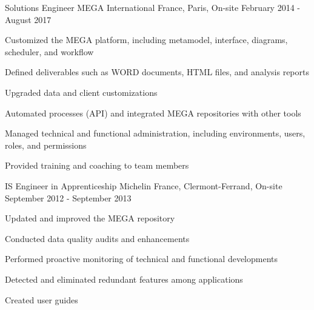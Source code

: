 \begin{cventries}
  \cventry
    {Solutions Engineer}
    {MEGA International}
    {France, Paris, On-site}
    {February 2014 - August 2017}
    {
      \begin{cvitems}
        \item {Customized the MEGA platform, including metamodel, interface, diagrams, scheduler, and workflow}
        \item {Defined deliverables such as WORD documents, HTML files, and analysis reports}
        \item {Upgraded data and client customizations}
        \item {Automated processes (API) and integrated MEGA repositories with other tools}
        \item {Managed technical and functional administration, including environments, users, roles, and permissions}
        \item {Provided training and coaching to team members}
      \end{cvitems}
    }

  \cventry
    {IS Engineer in Apprenticeship}
    {Michelin}
    {France, Clermont-Ferrand, On-site}
    {September 2012 - September 2013}
    {
      \begin{cvitems}
        \item {Updated and improved the MEGA repository}
        \item {Conducted data quality audits and enhancements}
        \item {Performed proactive monitoring of technical and functional developments}
        \item {Detected and eliminated redundant features among applications}
        \item {Created user guides}
      \end{cvitems}
    }

\end{cventries}
